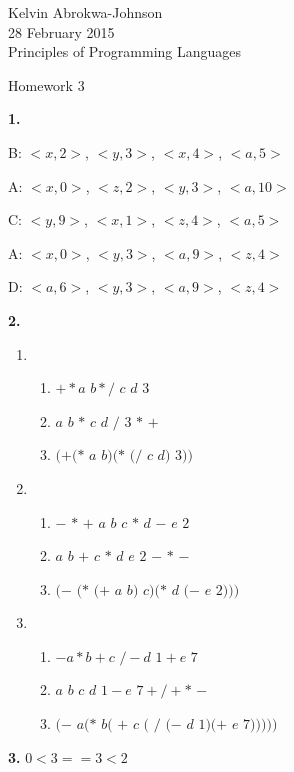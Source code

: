 \documentclass[11pt]{article} %
\begin{document}
 

Kelvin Abrokwa-Johnson \\
28 February 2015          \\
Principles of Programming Languages

\begin{center}
Homework 3
\end{center}

{\bf 1.}

B: $<x,2>$, $<y,3>$, $<x,4>$, $<a,5>$

A: $<x,0>$, $<z,2>$, $<y,3>$, $<a,10>$

C: $<y,9>$, $<x,1>$, $<z,4>$, $<a,5>$

A: $<x,0>$, $<y,3>$, $<a,9>$, $<z,4>$

D: $<a,6>$, $<y,3>$, $<a,9>$, $<z,4>$


\vskip 0.3in
{\bf 2.}

\begin{enumerate}[label=\alph*.]

\item
\begin{enumerate}
\item $ + * a$ $b * /$ $c$ $d$ $3$
\item $a$ $b$ $*$ $c$ $d$ $/$ $3$ $*$ $+$
\item $(+ (*$ $a$ $b) (*$ $(/$ $c$ $d)$ $3))$
\end{enumerate}

\item
\begin{enumerate}
\item $-$ $*$ $+$ $a$ $b$ $c$ $*$ $d$ $-$ $e$ $2$
\item $a$ $b$ $+$ $c$ $*$ $d$ $e$ $2$ $-$ $*$ $-$
\item $(-$ $(*$ $(+$ $a$ $b)$ $c) (*$ $d$ $(-$ $e$ $2)))$
\end{enumerate}

\item
\begin{enumerate}
\item $- a * b + c$ $/ - d$ $1 + e$ $7$
\item $a$ $b$ $c$ $d$ $1 - e$ $7 + / + *$ $-$
\item $(-$ $a (*$ $b ($ $+$ $c$ $($ $/$ $(-$ $d$ $1) (+$ $e$ $7)))))$
\end{enumerate}

\end{enumerate}


\vskip 0.3in
{\bf 3.} $0 < 3 == 3 < 2$
\end{document}
